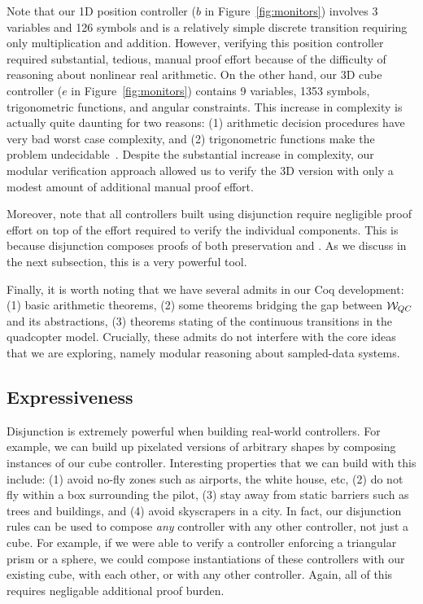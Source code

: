 Note that our 1D position controller ($b$ in Figure~\ref{fig:monitors})
involves 3 variables and 126 symbols and is a relatively simple discrete
transition requiring only multiplication and addition.  However, verifying
this position controller required substantial, tedious, manual proof effort
because of the difficulty of reasoning about nonlinear real arithmetic.  On
the other hand, our 3D cube controller ($e$ in Figure~\ref{fig:monitors})
contains 9 variables, 1353 symbols, trigonometric functions, and angular
constraints.  This increase in complexity is actually quite daunting for
two reasons: (1) arithmetic decision procedures have very bad worst case
complexity, and (2) trigonometric functions make the problem
undecidable~\cite{HarrisonLogic09}.  Despite the substantial increase in
complexity, our modular verification approach allowed us to verify the 3D
version with only a modest amount of additional manual proof effort.

Moreover, note that all controllers built using disjunction require
negligible proof effort on top of the effort required to verify the
individual components.  This is because disjunction composes proofs of both
preservation and \progress{}. As we discuss in the next subsection, this is
a very powerful tool.

Finally, it is worth noting that we have several admits in our Coq
development: (1) basic arithmetic theorems, (2) some theorems bridging the
gap between $\mathcal{W}_{QC}$ and its abstractions, (3) theorems
stating \progress{} of the continuous transitions in the quadcopter model.
Crucially, these admits do not interfere with the core ideas that we are
exploring, namely modular reasoning about sampled-data systems.

\subsection{Expressiveness}
Disjunction is extremely powerful when building real-world controllers.
For example, we can build up pixelated versions of arbitrary shapes by
composing instances of our cube controller.  Interesting properties that we
can build with this include: (1) avoid no-fly zones such as airports, the
white house, etc, (2) do not fly within a box surrounding the pilot, (3)
stay away from static barriers such as trees and buildings, and (4) avoid
skyscrapers in a city. In fact, our disjunction rules can be used to
compose \emph{any} controller with any other controller, not just a cube.
For example, if we were able to verify a controller enforcing a triangular
prism or a sphere, we could compose instantiations of these controllers
with our existing cube, with each other, or with any other controller.
Again, all of this requires negligable additional proof burden.


